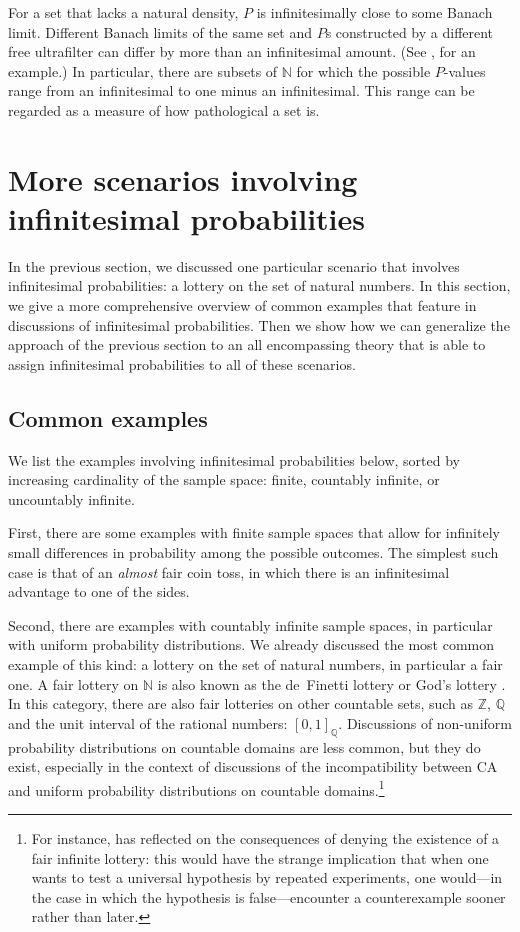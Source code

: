 For a set that lacks a natural density, $P$ is infinitesimally close to some Banach limit. Different Banach limits of the same set and $P$s constructed by a different free ultrafilter can differ by more than an infinitesimal amount. (See \citealp{KerkvlietMeester:2016}, for an example.) In particular, there are subsets of $\mathbb{N}$ for which the possible $P$-values range from an infinitesimal to one minus an infinitesimal. This range can be regarded as a measure of how pathological a set is.


\section{More scenarios involving infinitesimal probabilities}\label{sec:more}
In the previous section, we discussed one particular scenario that involves infinitesimal probabilities: a lottery on the set of natural numbers. In this section, we give a more comprehensive overview of common examples that feature in discussions of infinitesimal probabilities. Then we show how we can generalize the approach of the previous section to an all encompassing theory that is able to assign infinitesimal probabilities to all of these scenarios.

\subsection{Common examples}
We list the examples involving infinitesimal probabilities below, sorted by increasing cardinality of the sample space: finite, countably infinite, or uncountably infinite.

First, there are some examples with finite sample spaces that allow for infinitely small differences in probability among the possible outcomes. The simplest such case is that of an \emph{almost} fair coin toss, in which there is an infinitesimal advantage to one of the sides.

Second, there are examples with countably infinite sample spaces, in particular with uniform probability distributions.
We already discussed the most common example of this kind: a lottery on the set of natural numbers, in particular a fair one. A fair lottery on $\mathbb{N}$ is also known as the de~Finetti lottery \citep{Bartha:2004} or God's lottery \citep{McCallArmstrong:1989}.
In this category, there are also fair lotteries on other countable sets, such as $\mathbb{Z}$, $\mathbb{Q}$ and the unit interval of the rational numbers: $[0,1]_\mathbb{Q}$.
Discussions of non-uniform probability distributions on countable domains are less common, but they do exist, especially in the context of discussions of the incompatibility between CA and uniform probability distributions on countable domains.\footnote{For instance, \citet{Kelly:1996} has reflected on the consequences of denying the existence of a fair infinite lottery: this would have the strange implication that when one wants to test a universal hypothesis by repeated experiments, one would---in the case in which the hypothesis is false---encounter a counterexample sooner rather than later.}

